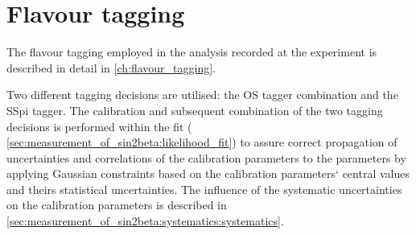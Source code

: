 
\section{Flavour tagging}
\label{sec:measurement_of_sin2beta:flavour_tagging}

The flavour tagging employed in the analysis recorded at the \LHCb experiment is
described in detail in \cref{ch:flavour_tagging}.

Two different tagging decisions are utilised: the \acf{OS} tagger combination
and the \acf{SSpi} tagger. The calibration and subsequent combination of the two
tagging decisions is performed within the fit (\cf
\cref{sec:measurement_of_sin2beta:likelihood_fit}) to assure correct propagation
of uncertainties and correlations of the calibration parameters to the \CP
parameters by applying Gaussian constraints based on the calibration parameters`
central values and theirs statistical uncertainties. The influence of the
systematic uncertainties on the calibration parameters is described in
\cref{sec:measurement_of_sin2beta:systematics:systematics}.
